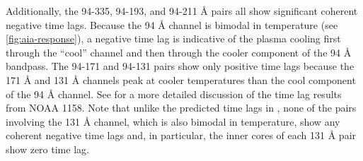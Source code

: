 Additionally, the 94-335, 94-193, and 94-211 \AA{} pairs all show significant coherent negative time lags.
Because the 94 \AA{} channel is bimodal in temperature (see \autoref{fig:aia-response}), a negative time lag is indicative of the plasma cooling first through the ``cool'' channel and then through the cooler component of the 94 \AA{} bandpass.
The 94-171 and 94-131 pairs show only positive time lags because the 171 \AA{} and 131 \AA{} channels peak at cooler temperatures than the cool component of the 94 \AA{} channel.
See  for a more detailed discussion of the time lag results from NOAA 1158.
Note that unlike the predicted time lags in , none of the pairs involving the 131 \AA{} channel, which is also bimodal in temperature, show any coherent negative time lags and, in particular, the inner cores of each 131 \AA{} pair show zero time lag.

